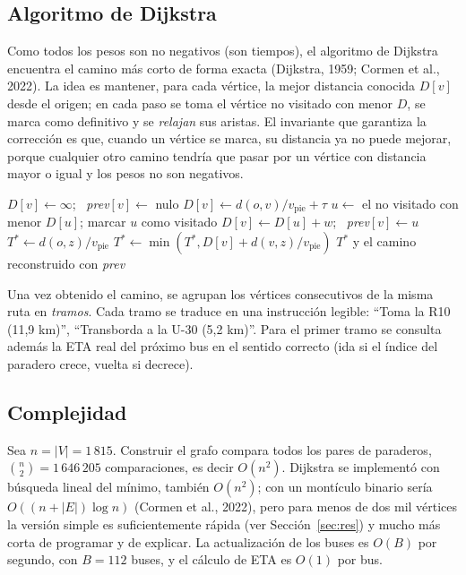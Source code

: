 \documentclass[12pt,letterpaper]{article}
\begin{document}
\subsection{Algoritmo de Dijkstra}
Como todos los pesos son no negativos (son tiempos), el algoritmo de Dijkstra encuentra el camino más corto de forma exacta (Dijkstra, 1959; Cormen et al., 2022). La idea es mantener, para cada vértice, la mejor distancia conocida $D[v]$ desde el origen; en cada paso se toma el vértice no visitado con menor $D$, se marca como definitivo y se \textit{relajan} sus aristas. El invariante que garantiza la corrección es que, cuando un vértice se marca, su distancia ya no puede mejorar, porque cualquier otro camino tendría que pasar por un vértice con distancia mayor o igual y los pesos no son negativos.

\begin{algorithm}[H]
\caption{Mejor viaje entre el origen $o$ y el destino $z$}
\begin{algorithmic}[1]
 $D[v]\gets\infty$; \ \textit{prev}$[v]\gets$ nulo
\EndFor
{} $D[v]\gets d(o,v)/v_{\text{pie}}+\tau$
\EndFor
{}
  \State $u\gets$ el no visitado con menor $D[u]$; marcar $u$ como visitado
     $D[v]\gets D[u]+w$; \ \textit{prev}$[v]\gets u$ \EndIf
  \EndFor
\EndWhile
\State $T^\ast\gets d(o,z)/v_{\text{pie}}$ 
 $T^\ast\gets\min(T^\ast, D[v]+d(v,z)/v_{\text{pie}})$
\EndFor
\State \Return $T^\ast$ y el camino reconstruido con \textit{prev}
\EndFunction
\end{algorithmic}
\end{algorithm}

Una vez obtenido el camino, se agrupan los vértices consecutivos de la misma ruta en \textit{tramos}. Cada tramo se traduce en una instrucción legible: ``Toma la R10 (11,9 km)'', ``Transborda a la U-30 (5,2 km)''. Para el primer tramo se consulta además la ETA real del próximo bus en el sentido correcto (ida si el índice del paradero crece, vuelta si decrece).

\subsection{Complejidad}
Sea $n=|V|=1\,815$. Construir el grafo compara todos los pares de paraderos, $\binom{n}{2}=1\,646\,205$ comparaciones, es decir $O(n^2)$. Dijkstra se implementó con búsqueda lineal del mínimo, también $O(n^2)$; con un montículo binario sería $O((n+|E|)\log n)$ (Cormen et al., 2022), pero para menos de dos mil vértices la versión simple es suficientemente rápida (ver Sección~\ref{sec:res}) y mucho más corta de programar y de explicar. La actualización de los buses es $O(B)$ por segundo, con $B=112$ buses, y el cálculo de ETA es $O(1)$ por bus.
\end{document}
